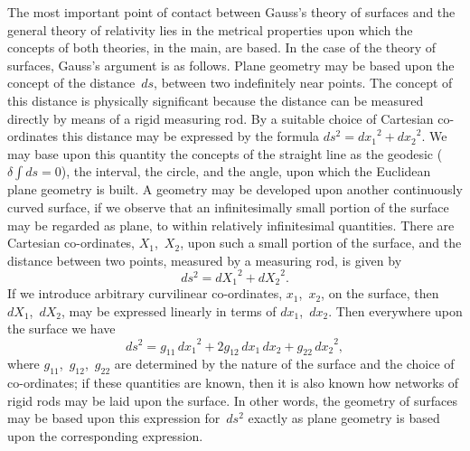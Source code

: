 \documentclass[12pt]{book}[2005/09/16]
\newcommand{\Change}[2]{#2}
\newcommand{\Add}[1]{\Change{}{#1}}
\newcommand{\PageSep}[1]{\ignorespaces}
\begin{document}
The most important point of contact between Gauss's
theory of surfaces and the general theory of relativity
lies in the metrical properties upon which the concepts
of both theories, in the main, are based. In the case
of the theory of surfaces, Gauss's argument is as follows.
Plane geometry may be based upon the concept of the
distance~$ds$, between two indefinitely near points. The
\PageSep{69}
concept of this distance is physically significant because
the distance can be measured directly by means of a
rigid measuring rod. By a suitable choice of Cartesian
co-ordinates this distance may be expressed by the
formula $ds^{2} = {dx_{1}}^{2} + {dx_{2}}^{2}$. We may base upon this
quantity the concepts of the straight line as the geodesic
($\delta\! \int\!\! ds = 0$), the interval, the circle, and the angle, upon
which the Euclidean plane geometry is built. A
geometry may be developed upon another continuously
curved surface, if we observe that an infinitesimally
small portion of the surface may be regarded as plane,
to within relatively infinitesimal quantities. There are
Cartesian co-ordinates, $X_{1}$,~$X_{2}$, upon such a small
portion of the surface, and the distance between two
points, measured by a measuring rod, is given by
\[
ds^{2} = {dX_{1}}^{2} + {dX_{2}}^{2}.
\]
If we introduce arbitrary curvilinear co-ordinates, $x_{1}$,~$x_{2}$,
on the surface, then $dX_{1}$,~$dX_{2}$, may be expressed linearly
in terms of $dx_{1}$,~$dx_{2}$. Then everywhere upon the surface
we have
\[
ds^{2} = g_{11}\, {dx_{1}}^{2} + 2g_{12}\, dx_{1}\, dx_{2}
     + g_{22}\, {dx_{2}}^{2}\Add{,}
\]
where $g_{11}$,~$g_{12}$,~$g_{22}$ are determined by the nature of the
surface and the choice of co-ordinates; if these quantities
are known, then it is also known how networks of rigid
rods may be laid upon the surface. In other words, the
geometry of surfaces may be based upon this expression
for~$ds^{2}$ exactly as plane geometry is based upon the
corresponding expression.
\end{document}
